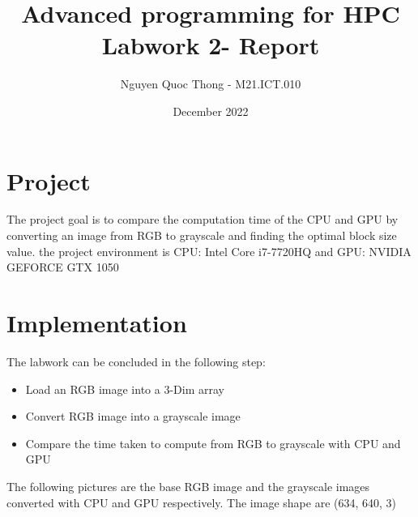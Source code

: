\documentclass{article}
\title{Advanced programming for HPC Labwork 2- Report}
\author{Nguyen Quoc Thong - M21.ICT.010}
\date{December 2022}
\begin{document}
\maketitle

\section{Project}
The project goal is to compare the computation time of the CPU and GPU by converting an image from RGB to grayscale and finding the optimal block size value. the project environment is CPU: Intel Core i7-7720HQ and GPU: NVIDIA GEFORCE GTX 1050

\section{Implementation}
The labwork can be concluded in the following step:
\begin{itemize}
    \item Load an RGB image into a 3-Dim array
    \item Convert RGB image into a grayscale image
    \item Compare the time taken to compute from RGB to grayscale with CPU and GPU
\end{itemize}

The following pictures are the base RGB image and the grayscale images converted with CPU and GPU respectively. The image shape are (634, 640, 3)

\begin{figure}[H]
\end{figure}
\end{document}
